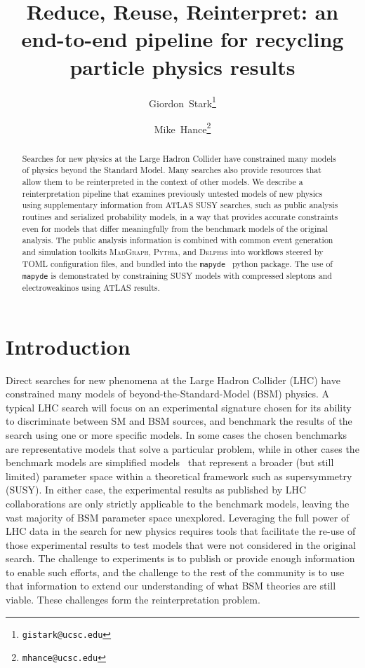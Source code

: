 \documentclass{article}
\title{Reduce, Reuse, Reinterpret: an end-to-end pipeline for recycling particle physics results}
\author[ \,,1a]{\orcidaffil{0000-0001-6616-3433}Giordon~Stark\thanks{\texttt{gistark@ucsc.edu}}}
\author[ \,,1b]{\orcidaffil{0000-0001-8392-0934}Mike~Hance\thanks{\texttt{mhance@ucsc.edu}}}
\affil[1]{University of California, Santa Cruz\\ Santa Cruz Institute for Particle Physics\\1156 High Street\\Santa Cruz, CA 95064}
\affil[a]{Interdisciplinary Sciences Building, Room \#337}
\affil[b]{Natural Sciences 2, Room \#317}
\newcommand{\mapyde}{\texttt{mapyde}}
\newcommand{\madgraph}{\textsc{MadGraph}}
\newcommand{\pythia}{\textsc{Pythia}}
\newcommand{\delphes}{\textsc{Delphes}}
\begin{document}
\maketitle

\begin{abstract}
	Searches for new physics at the Large Hadron Collider have constrained many models of physics beyond the Standard Model.  Many searches also provide resources that allow them to be reinterpreted in the context of other models.  We describe a reinterpretation pipeline that examines previously untested models of new physics using supplementary information from ATLAS SUSY searches, such as public analysis routines and serialized probability models, in a way that provides accurate constraints even for models that differ meaningfully from the benchmark models of the original analysis.  The public analysis information is combined with common event generation and simulation toolkits \madgraph, \pythia, and \delphes{} into workflows steered by \textsc{TOML} configuration files, and bundled into the \mapyde{}~\cite{mapyde} python package.  The use of \mapyde{} is demonstrated by constraining SUSY models with compressed sleptons and electroweakinos using ATLAS results.
\end{abstract}




\section{Introduction}
\label{sec:introduction}

Direct searches for new phenomena at the Large Hadron Collider (LHC) have constrained many models of beyond-the-Standard-Model (BSM) physics.  A typical LHC search will focus on an experimental signature chosen for its ability to discriminate between SM and BSM sources, and benchmark the results of the search using one or more specific models.  In some cases the chosen benchmarks are representative models that solve a particular problem, while in other cases the benchmark models are simplified models~\cite{LHCNewPhysicsWorkingGroup:2011mji} that represent a broader (but still limited) parameter space within a theoretical framework such as supersymmetry (SUSY).  In either case, the experimental results as published by LHC collaborations are only strictly applicable to the benchmark models, leaving the vast majority of BSM parameter space unexplored.  Leveraging the full power of LHC data in the search for new physics requires tools that facilitate the re-use of those experimental results to test models that were not considered in the original search.  The challenge to experiments is to publish or provide enough information to enable such efforts, and the challenge to the rest of the community is to use that information to extend our understanding of what BSM theories are still viable.  These challenges form the reinterpretation problem.
\end{document}
